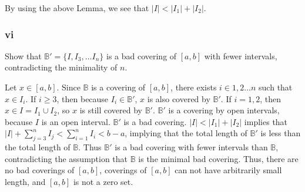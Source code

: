 \documentclass{article}
\newcommand{\B}{\mathbb{B}}
\begin{document}
By using the above Lemma, we see that $|I| < |I_1| + |I_2|$.

\subsubsection*{vi}

Show that $\B' = \{I, I_3, \dots I_n\}$ is a bad covering of $[a, b]$ with fewer intervals, contradicting the minimality of $n$.

Let $x \in [a, b]$. Since $\B$ is a covering of $[a, b]$, there exists $i \in 1, 2 \dots n$ such that $x \in I_i$. If $i \geq 3$, then because $I_i \in \B'$, $x$ is also covered by $\B'$. If $i = 1, 2$, then $x \in I = I_1 \cup I_2$, so $x$ is still covered by $\B'$. $\B'$ is a covering by open intervals, because $I$ is an open interval. $\B'$ is a bad covering. $|I| < |I_1| + |I_2|$ implies that $|I| + \sum_{j=3}^n I_j < \sum_{i=1}^n I_i < b-a$, implying that the total length of $\B'$ is less than the total length of $\B$. Thus $\B'$ is a bad covering with fewer intervals than $\B$, contradicting the assumption that $\B$ is the minimal bad covering. Thus, there are no bad coverings of $[a, b]$, coverings of $[a, b]$ can not have arbitrarily small length, and $[a, b]$ is not a zero set.
\end{document}
